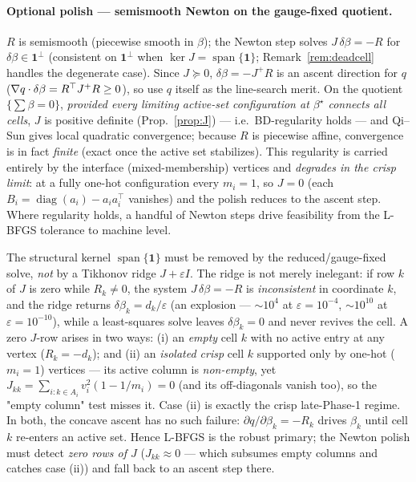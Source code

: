 \documentclass[11pt,a4paper]{article}
\begin{document}
\paragraph{Optional polish --- semismooth Newton on the gauge-fixed quotient.} $R$ is
semismooth (piecewise smooth in $\beta$); the Newton step solves $J\,\delta\beta=-R$ for
$\delta\beta\in\mathbf 1^\perp$ (consistent on $\mathbf 1^\perp$ when
$\ker J=\operatorname{span}\{\mathbf 1\}$; Remark~\ref{rem:deadcell} handles the degenerate
case). Since $J\succeq0$, $\delta\beta=-J^{+}R$ is an ascent direction for $q$
($\nabla q\cdot\delta\beta=R^\top J^{+}R\ge0$), so use $q$ itself as the line-search merit. On
the quotient $\{\sum\beta=0\}$, \emph{provided every limiting active-set configuration at
$\beta^\star$ connects all cells}, $J$ is positive definite (Prop.~\ref{prop:J}) --- i.e.\
BD-regularity holds --- and Qi--Sun \cite{qi1993nonsmooth,hintermuller2002semismooth} gives
local quadratic convergence; because $R$ is piecewise affine, convergence is in fact
\emph{finite} (exact once the active set stabilizes). This regularity is carried entirely by
the interface (mixed-membership) vertices and \emph{degrades in the crisp limit}: at a fully
one-hot configuration every $m_i=1$, so $J=0$ (each $B_i=\operatorname{diag}(a_i)-a_ia_i^\top$
vanishes) and the polish reduces to the ascent step. Where regularity holds, a handful of
Newton steps drive feasibility from the L-BFGS tolerance to machine level.

\begin{remark}[why not an $\varepsilon$-ridge; the zero-row degeneracy]
\label{rem:deadcell}
The structural kernel $\operatorname{span}\{\mathbf 1\}$ must be removed by the reduced/gauge-fixed
solve, \emph{not} by a Tikhonov ridge $J+\varepsilon I$. The ridge is not merely inelegant: if
row $k$ of $J$ is zero while $R_k\ne0$, the system $J\,\delta\beta=-R$ is \emph{inconsistent} in
coordinate $k$, and the ridge returns $\delta\beta_k=d_k/\varepsilon$ (an explosion ---
$\sim\!10^{4}$ at $\varepsilon=10^{-4}$, $\sim\!10^{10}$ at $\varepsilon=10^{-10}$), while a
least-squares solve leaves $\delta\beta_k=0$ and never revives the cell. A zero $J$-row arises
in two ways: (i) an \emph{empty} cell $k$ with no active entry at any vertex ($R_k=-d_k$); and
(ii) an \emph{isolated crisp} cell $k$ supported only by one-hot ($m_i=1$) vertices --- its
active column is \emph{non-empty}, yet $J_{kk}=\sum_{i:k\in A_i}v_i^2(1-1/m_i)=0$ (and its
off-diagonals vanish too), so the "empty column" test misses it. Case (ii) is exactly the
crisp late-Phase-1 regime. In both, the concave ascent has no such failure:
$\partial q/\partial\beta_k=-R_k$ drives $\beta_k$ until cell $k$ re-enters an active set.
Hence L-BFGS is the robust primary; the Newton polish must detect \emph{zero rows of $J$}
($J_{kk}\approx0$ --- which subsumes empty columns and catches case (ii)) and fall back to an
ascent step there.
\end{remark}
\end{document}
